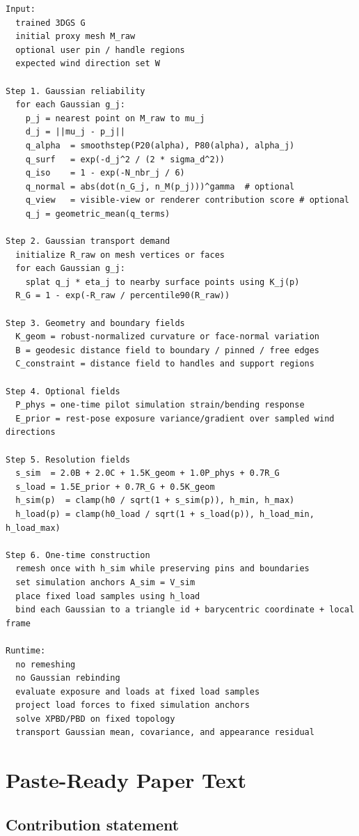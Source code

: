 \documentclass[11pt,a4paper]{article}
\begin{document}
\begin{lstlisting}
Input:
  trained 3DGS G
  initial proxy mesh M_raw
  optional user pin / handle regions
  expected wind direction set W

Step 1. Gaussian reliability
  for each Gaussian g_j:
    p_j = nearest point on M_raw to mu_j
    d_j = ||mu_j - p_j||
    q_alpha  = smoothstep(P20(alpha), P80(alpha), alpha_j)
    q_surf   = exp(-d_j^2 / (2 * sigma_d^2))
    q_iso    = 1 - exp(-N_nbr_j / 6)
    q_normal = abs(dot(n_G_j, n_M(p_j)))^gamma  # optional
    q_view   = visible-view or renderer contribution score # optional
    q_j = geometric_mean(q_terms)

Step 2. Gaussian transport demand
  initialize R_raw on mesh vertices or faces
  for each Gaussian g_j:
    splat q_j * eta_j to nearby surface points using K_j(p)
  R_G = 1 - exp(-R_raw / percentile90(R_raw))

Step 3. Geometry and boundary fields
  K_geom = robust-normalized curvature or face-normal variation
  B = geodesic distance field to boundary / pinned / free edges
  C_constraint = distance field to handles and support regions

Step 4. Optional fields
  P_phys = one-time pilot simulation strain/bending response
  E_prior = rest-pose exposure variance/gradient over sampled wind directions

Step 5. Resolution fields
  s_sim  = 2.0B + 2.0C + 1.5K_geom + 1.0P_phys + 0.7R_G
  s_load = 1.5E_prior + 0.7R_G + 0.5K_geom
  h_sim(p)  = clamp(h0 / sqrt(1 + s_sim(p)), h_min, h_max)
  h_load(p) = clamp(h0_load / sqrt(1 + s_load(p)), h_load_min, h_load_max)

Step 6. One-time construction
  remesh once with h_sim while preserving pins and boundaries
  set simulation anchors A_sim = V_sim
  place fixed load samples using h_load
  bind each Gaussian to a triangle id + barycentric coordinate + local frame

Runtime:
  no remeshing
  no Gaussian rebinding
  evaluate exposure and loads at fixed load samples
  project load forces to fixed simulation anchors
  solve XPBD/PBD on fixed topology
  transport Gaussian mean, covariance, and appearance residual
\end{lstlisting}

\section{Paste-Ready Paper Text}

\subsection{Contribution statement}
\end{document}
